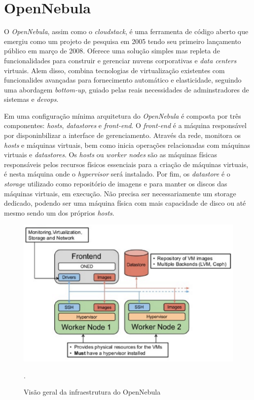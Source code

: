 \section{OpenNebula}
O \textit{OpenNebula}, assim como o \textit{cloudstack}, é uma ferramenta de código aberto que emergiu como um projeto de pesquisa em 2005 tendo seu primeiro lançamento público em março de 2008. Oferece uma solução simples mas repleta de funcionalidades para construir e gerenciar nuvens corporativas e \textit{data centers} virtuais. Alem disso, combina tecnologias de virtualização existentes com funcionalides avançadas para fornecimento automático e elasticidade, seguindo uma abordagem \textit{bottom-up}, guiado pelas reais necessidades de adminstradores de sistemas e \textit{devops}\cite{opennebula}.

Em uma configuração mínima  arquitetura do \textit{OpenNebula} é composta por três componentes: \textit{hosts}, \textit{datastores} e \textit{front-end}. O \textit{front-end} é a máquina responsável por disponinbilizar a interface de gerenciamento. Através da rede, monitora os \textit{hosts} e máquinas virtuais, bem como inicia operações relacionadas com máquinas virtuais e \textit{datastores}. Os \textit{hosts} ou \textit{worker nodes} são as máquinas físicas responsáveis pelos recursos físicos essenciais para a criação de máquinas virtuais, é nesta máquina onde o \textit{hypervisor} será instalado. Por fim, os \textit{datastore} é o \textit{storage} utilizado como repositório de imagens e para manter os discos das máquinas virtuais, em execução. Não precisa ser necessariamente um storage dedicado, podendo ser uma máquina física com mais capacidade de disco ou até mesmo sendo um dos próprios \textit{hosts}.  


\begin{figure}[!htb]
\centering
\includegraphics [keepaspectratio=true,scale=0.70]{figuras/opennebula_instalation.eps}
\caption{Visão geral da infraestrutura do OpenNebula}
\cite{opennebula}.
\label{diagramaopennebula}
\end{figure}

